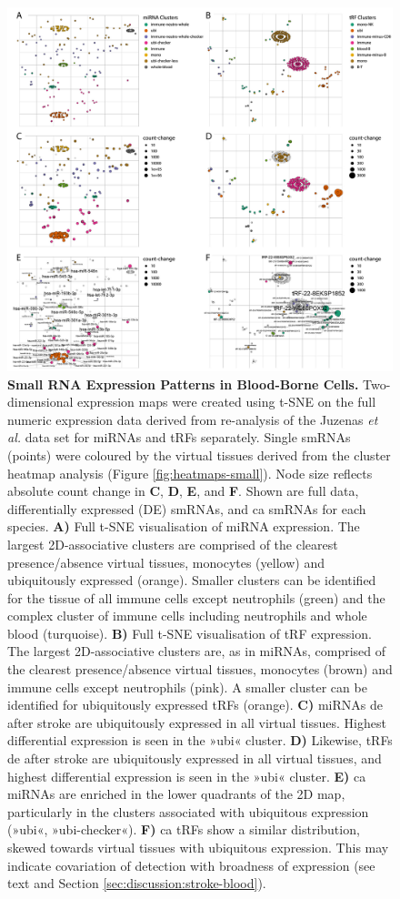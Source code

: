 \begin{figure}
\includegraphics[width=\textwidth]{figures/tsne-small}
\caption[Small RNA Expression Patterns in Blood-Borne Cells.]{\textbf{Small RNA Expression Patterns in Blood-Borne Cells.} Two-dimensional expression maps were created using t-SNE on the full numeric expression data derived from re-analysis of the Juzenas \emph{et al.}\cite{Juzenas2017} data set for miRNAs and tRFs separately. Single smRNAs (points) were coloured by the virtual tissues derived from the cluster heatmap analysis (Figure \ref{fig:heatmaps-small}). Node size reflects absolute count change in \textbf{C}, \textbf{D}, \textbf{E}, and \textbf{F}. Shown are full data, differentially expressed (DE) smRNAs, and \acf{ca} smRNAs for each species. \textbf{A)} Full t-SNE visualisation of miRNA expression. The largest 2D-associative clusters are comprised of the clearest presence/absence virtual tissues, monocytes (yellow) and ubiquitously expressed (orange). Smaller clusters can be identified for the tissue of all immune cells except neutrophils (green) and the complex cluster of immune cells including neutrophils and whole blood (turquoise). \textbf{B)} Full t-SNE visualisation of tRF expression. The largest 2D-associative clusters are, as in miRNAs, comprised of the clearest presence/absence virtual tissues, monocytes (brown) and immune cells except neutrophils (pink). A smaller cluster can be identified for ubiquitously expressed tRFs (orange). \textbf{C)} miRNAs \ac{de} after stroke are ubiquitously expressed in all virtual tissues. Highest differential expression is seen in the »ubi« cluster. \textbf{D)} Likewise, tRFs \ac{de} after stroke are ubiquitously expressed in all virtual tissues, and highest differential expression is seen in the »ubi« cluster. \textbf{E)} \Ac{ca} miRNAs are enriched in the lower quadrants of the 2D map, particularly in the clusters associated with ubiquitous expression (»ubi«, »ubi-checker«). \textbf{F)} \Ac{ca} tRFs show a similar distribution, skewed towards virtual tissues with ubiquitous expression. This may indicate covariation of detection with broadness of expression (see text and Section \ref{sec:discussion:stroke-blood}).
}
\end{figure}
